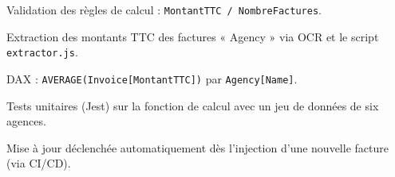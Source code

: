 \documentclass[a4paper,11pt]{report}
\begin{document}
\begin{description}[leftmargin=1.5cm, style=nextline]
  \item[\textbf{Gouvernance}]  
    Validation des règles de calcul : \texttt{MontantTTC / NombreFactures}.  
  \item[\textbf{Investigation}]  
    Extraction des montants TTC des factures « Agency » via OCR et le script \texttt{extractor.js}.  
  \item[\textbf{Modélisation}]  
    DAX : \texttt{AVERAGE(Invoice[MontantTTC])} par \texttt{Agency[Name]}.  
  \item[\textbf{Simulation}]  
    Tests unitaires (Jest) sur la fonction de calcul avec un jeu de données de six agences.  
  \item[\textbf{Industrialisation}]  
    Mise à jour déclenchée automatiquement dès l’injection d’une nouvelle facture (via CI/CD).
\end{description}

\end{document}

